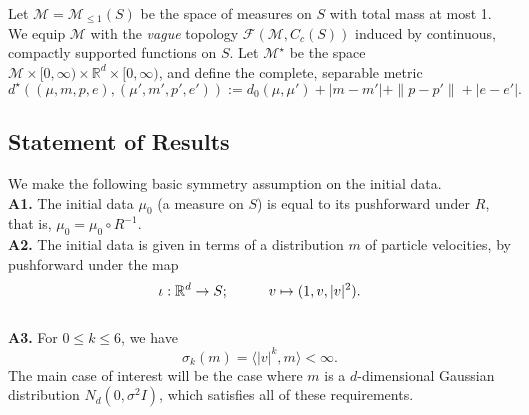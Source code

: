 \begin{definition} Let $\mathcal{M}=\mathcal{M}_{\le 1}(S)$ be the space of measures on $S$ with total mass at most 1. We equip $\mathcal{M}$ with the \emph{vague} topology $\mathcal{F}(\mathcal{M}, C_c(S))$ induced by continuous, compactly supported functions on $S$. Let $\mathcal{M}^\star$ be the space $\mathcal{M}\times [0,\infty)\times \mathbb{R}^d\times [0, \infty)$, and define the complete, separable metric \begin{equation} d^\star\left((\mu, m, p, e), (\mu', m',p',e')\right):=d_0(\mu, \mu')+|m-m'|+\|p-p'\|+|e-e'|. \end{equation} \end{definition}
\subsection{Statement of Results}

We make the following basic symmetry assumption on the initial data.
\\\textbf{A1.} The initial data $\mu_0$ (a measure on $S$) is equal to its pushforward under $R$, that is, $\mu_0 = \mu_0 \circ R^{-1}$.
\\ \textbf{A2.} The initial data is given in terms of a distribution $m$ of particle velocities, by pushforward under the map
\begin{equation}
    \iota: \mathbb{R}^d \rightarrow S; \hspace{1cm} v\mapsto (1, v, |v|^2).
\end{equation}
\\ \textbf{A3.} For $0\leq k\leq 6$, we have
\begin{equation}
    \sigma_k(m)=\langle |v|^k, m\rangle <\infty.
\end{equation}  The main case of interest will be the case where $m$ is a $d$-dimensional Gaussian distribution $N_d(0, \sigma^2I)$, which satisfies all of these requirements.

